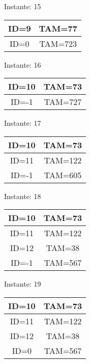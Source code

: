 \documentclass[10pt,a4paper]{article}
\begin{document}
\pagebreak
\begin{center}

Instante: 15

\begin{tabular}{|c|c|}
\hline
ID=9 & TAM=77 \\ \hline
ID=0 & TAM=723 \\ \hline
\end{tabular}
\end{center}
\pagebreak
\begin{center}

Instante: 16

\begin{tabular}{|c|c|}
\hline
ID=10 & TAM=73 \\ \hline
ID=-1 & TAM=727 \\ \hline
\end{tabular}
\end{center}
\pagebreak
\begin{center}

Instante: 17

\begin{tabular}{|c|c|}
\hline
ID=10 & TAM=73 \\ \hline
ID=11 & TAM=122 \\ \hline
ID=-1 & TAM=605 \\ \hline
\end{tabular}
\end{center}
\pagebreak
\begin{center}

Instante: 18

\begin{tabular}{|c|c|}
\hline
ID=10 & TAM=73 \\ \hline
ID=11 & TAM=122 \\ \hline
ID=12 & TAM=38 \\ \hline
ID=-1 & TAM=567 \\ \hline
\end{tabular}
\end{center}
\pagebreak
\begin{center}

Instante: 19

\begin{tabular}{|c|c|}
\hline
ID=10 & TAM=73 \\ \hline
ID=11 & TAM=122 \\ \hline
ID=12 & TAM=38 \\ \hline
ID=0 & TAM=567 \\ \hline
\end{tabular}
\end{center}
\end{document}
